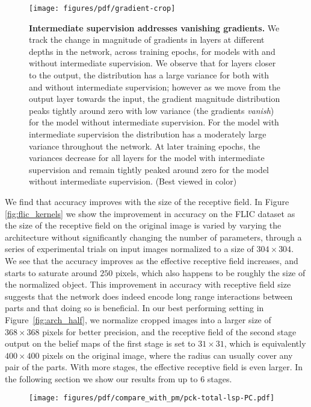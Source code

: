 \documentclass[10pt,twocolumn,letterpaper]{article}
\begin{document}
\begin{figure*}[ht!]
    \centering
    \texttt{[image: figures/pdf/gradient-crop]}
    \caption{\textbf{Intermediate supervision addresses vanishing gradients.} We track the change in magnitude of gradients in layers at different depths in the network, across training epochs, for models with and without intermediate supervision. We observe that for layers closer to the output, the distribution has a large variance for both with and without intermediate supervision; however as we move from the output layer towards the input, the gradient magnitude distribution peaks tightly around zero with low variance (the gradients \emph{vanish}) for the model without intermediate supervision. For the model with intermediate supervision the distribution has a moderately large variance throughout the network. At later training epochs, the variances decrease for all layers for the model with intermediate supervision and remain tightly peaked around zero for the model without intermediate supervision. (Best viewed in color)}
    \label{fig:gradient_change}
\end{figure*}
We find that accuracy improves with the size of the receptive field. In Figure \ref{fig:flic_kernels} we show the improvement in accuracy on the FLIC dataset \cite{sappmodec} as the size of the receptive field on the original image is varied by varying the architecture without significantly changing the number of parameters,  through a series of experimental trials on input images normalized to a size of $304 \times 304$. We see that the accuracy improves as the effective receptive field increases, and starts to saturate around $250$ pixels, which also happens to be roughly the size of the normalized object. This improvement in accuracy with receptive field size suggests that the network does indeed encode long range interactions between parts and that doing so is beneficial.
In our best performing setting in Figure~\ref{fig:arch_half}, we normalize cropped images into a larger size of $368 \times 368$ pixels for better precision, and the receptive field of the second stage output on the belief maps of the first stage is set to $31\times 31$, which is equivalently $400\times 400$ pixels on the original image, where the radius can usually cover any pair of the parts. With more stages, the effective receptive field is even larger. In the following section we show our results from up to $6$ stages.
    \begin{subfigure}{0.33\textwidth}
   	     \centering
         \texttt{[image: figures/pdf/compare\_with\_pm/pck-total-lsp-PC.pdf]}
         \caption{}
         \label{fig:comp_with_pm}
    \end{subfigure}
\end{document}
